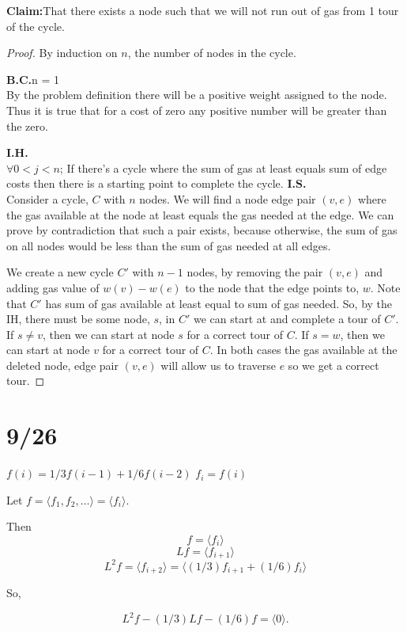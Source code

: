 \documentclass{article}
\begin{document}
\textbf{Claim:}That there exists a node such that we will not run out of gas from 1 tour of the cycle. 
\begin{proof}
By induction on $n$, the number of nodes in the cycle.    

\textbf{B.C.}n = 1\\
By the problem definition there will be a positive weight assigned to the node. Thus it is true that for a cost of zero any positive number will be greater than the zero. 

\textbf{I.H.}\\ $\forall 0<j<n$; If there's a cycle where the sum of gas at least equals sum of edge costs then there is a starting point to complete the cycle.  
\textbf{I.S.}\\
Consider a cycle, $C$ with $n$ nodes.  We will find a node edge pair $(v,e)$ where the gas available at the node at least equals the gas needed at the edge.  We can prove by contradiction that such a pair exists, because otherwise, the sum of gas on all nodes would be less than the sum of gas needed at all edges.

We create a new cycle $C'$ with $n-1$ nodes, by removing the pair $(v,e)$ and adding gas value of $w(v) - w(e)$ to the node that the edge points to, $w$.  Note that $C'$ has sum of gas available at least equal to sum of gas needed.  So, by the IH, there must be some node, $s$, in $C'$ we can start at and complete a tour of $C'$.  If $s \neq v$, then we can start at node $s$ for a correct tour of $C$.  If $s = w$, then we can start at node $v$ for a correct tour of $C$. 
In both cases the gas available at the deleted node, edge pair $(v,e)$ will allow us to traverse $e$ so we get a correct tour.

\end{proof}



\section{9/26}

$f(i) = 1/3 f(i-1) + 1/6 f(i-2)$
$f_i = f(i)$

Let $f = \langle f_1, f_2, \ldots \rangle = \langle f_i \rangle$.

Then 
$$f = \langle f_i \rangle$$
$$Lf = \langle f_{i+1} \rangle$$
$$L^2f = \langle f_{i+2} \rangle = \langle (1/3) f_{i+1} + (1/6) f_i \rangle$$

So,

$$L^2f - (1/3) Lf - (1/6) f = \langle 0 \rangle.$$
\end{document}
